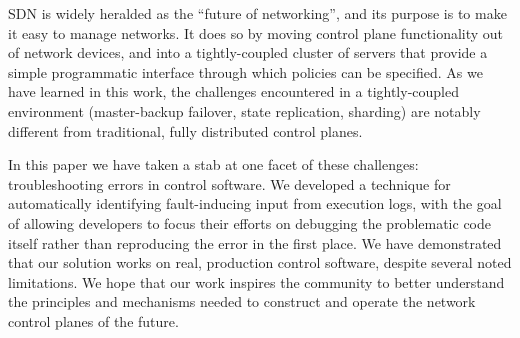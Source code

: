 
SDN is widely heralded as the ``future of networking'', and its purpose is to make
it easy to manage networks. It does so by moving control plane functionality out of
network devices, and into a tightly-coupled cluster of servers that provide a simple
programmatic interface through which policies can be specified. As we have
learned in this work, the challenges encountered
in a tightly-coupled environment (master-backup failover, state replication, sharding) are
notably different from traditional, fully distributed control planes.

In this paper we have taken a stab at one facet of these challenges:
troubleshooting errors in control software. We developed a technique for automatically
identifying fault-inducing input from execution logs, with the
goal of allowing developers to focus their efforts on debugging the problematic
code itself rather than reproducing the error in the first place. We have
demonstrated that our solution works on real, production control software,
despite several noted limitations. We hope that our work inspires the community to
better understand the principles and mechanisms needed to construct and
operate the network control planes of the future.

